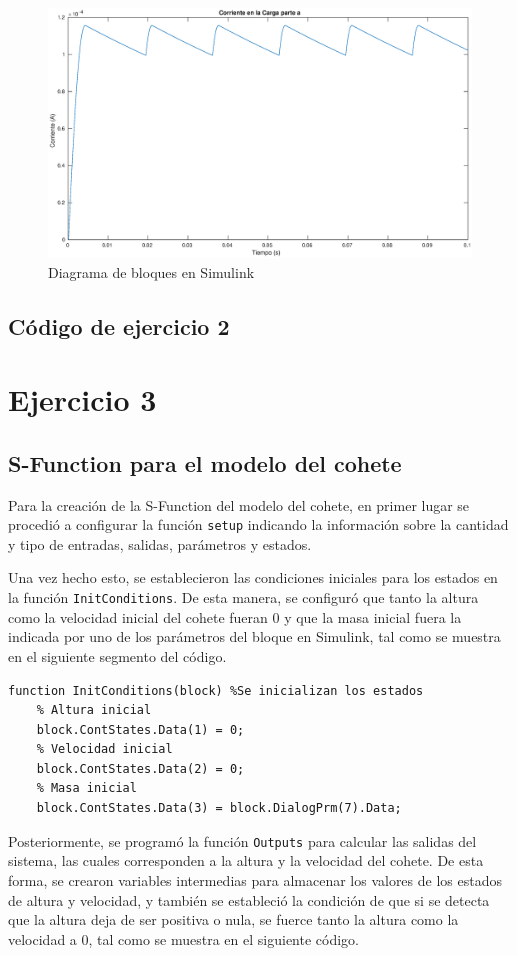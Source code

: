 \documentclass[12pt,letterpaper]{article}
\begin{document}
\begin{figure}[ht!]
  \centering
  \includegraphics[width=0.5\linewidth]{pictures/Ejercicio2_a_carga.eps}
  \caption{Diagrama de bloques en Simulink}
  \label{fig:2_a_carga}
\end{figure}

\subsection{Código de ejercicio 2}

\section{Ejercicio 3}

\subsection{S-Function para el modelo del cohete}
Para la creación de la S-Function del modelo del cohete, en primer lugar se procedió a configurar la
función \texttt{setup} indicando la información sobre la cantidad y tipo de entradas, salidas,
parámetros y estados.

Una vez hecho esto, se establecieron las condiciones iniciales para los estados en la función
\texttt{InitConditions}. De esta manera, se configuró que tanto la altura como la velocidad inicial
del cohete fueran 0 y que la masa inicial fuera la indicada por uno de los parámetros del bloque en
Simulink, tal como se muestra en el siguiente segmento del código.

\begin{lstlisting}[style=Matlab-editor, basicstyle=\mlttfamily]
  function InitConditions(block) %Se inicializan los estados
    % Altura inicial
    block.ContStates.Data(1) = 0;
    % Velocidad inicial
    block.ContStates.Data(2) = 0;
    % Masa inicial
    block.ContStates.Data(3) = block.DialogPrm(7).Data;
\end{lstlisting}

Posteriormente, se programó la función \texttt{Outputs} para calcular las salidas del sistema, las
cuales corresponden a la altura y la velocidad del cohete. De esta forma, se crearon variables
intermedias para almacenar los valores de los estados de altura y velocidad, y también se estableció la
condición de que si se detecta que la altura deja de ser positiva o nula, se fuerce tanto la altura
como la velocidad a 0, tal como se muestra en el siguiente código.
\end{document}
